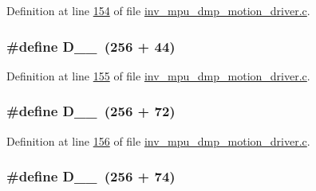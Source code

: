 Definition at line \hyperlink{inv__mpu__dmp__motion__driver_8c_source_l00154}{154} of file \hyperlink{inv__mpu__dmp__motion__driver_8c_source}{inv\+\_\+mpu\+\_\+dmp\+\_\+motion\+\_\+driver.\+c}.

\subsubsection[{\texorpdfstring{D\+\_\+1\+\_\+44}{D_1_44}}]{\setlength{\rightskip}{0pt plus 5cm}\#define D\+\_\+\_~(256 + 44)}\hypertarget{group___d_r_i_v_e_r_s_ga4fd075d6c0e817fbafca24af8305386e}{}\label{group___d_r_i_v_e_r_s_ga4fd075d6c0e817fbafca24af8305386e}


Definition at line \hyperlink{inv__mpu__dmp__motion__driver_8c_source_l00155}{155} of file \hyperlink{inv__mpu__dmp__motion__driver_8c_source}{inv\+\_\+mpu\+\_\+dmp\+\_\+motion\+\_\+driver.\+c}.

\subsubsection[{\texorpdfstring{D\+\_\+1\+\_\+72}{D_1_72}}]{\setlength{\rightskip}{0pt plus 5cm}\#define D\+\_\+\_~(256 + 72)}\hypertarget{group___d_r_i_v_e_r_s_ga065f93eacb4dcc7020cc21146e533110}{}\label{group___d_r_i_v_e_r_s_ga065f93eacb4dcc7020cc21146e533110}


Definition at line \hyperlink{inv__mpu__dmp__motion__driver_8c_source_l00156}{156} of file \hyperlink{inv__mpu__dmp__motion__driver_8c_source}{inv\+\_\+mpu\+\_\+dmp\+\_\+motion\+\_\+driver.\+c}.

\subsubsection[{\texorpdfstring{D\+\_\+1\+\_\+74}{D_1_74}}]{\setlength{\rightskip}{0pt plus 5cm}\#define D\+\_\+\_~(256 + 74)}\hypertarget{group___d_r_i_v_e_r_s_gaadac9643410cb6abb08481bebc549d0d}{}\label{group___d_r_i_v_e_r_s_gaadac9643410cb6abb08481bebc549d0d}



